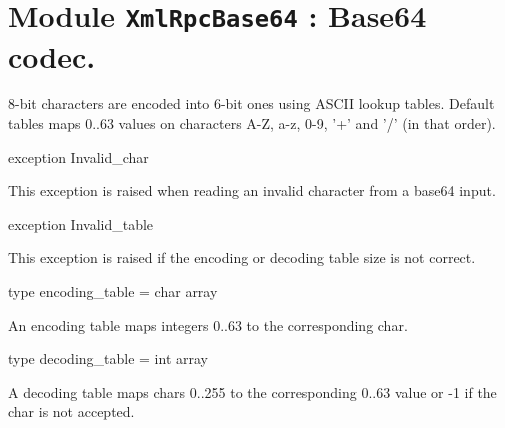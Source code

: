 \documentclass[11pt]{article}
\begin{document}
\section{Module {\tt{XmlRpcBase64}} : Base64 codec.}
\label{module:XmlRpcBase64}



	8-bit characters are encoded into 6-bit ones using ASCII lookup tables.
	Default tables maps 0..63 values on characters A-Z, a-z, 0-9, '+' and '/'
	(in that order).



\ocamldocvspace{0.5cm}



\label{exception:XmlRpcBase64.Invalid-underscorechar}\begin{ocamldoccode}
exception Invalid_char
\end{ocamldoccode}
\begin{ocamldocdescription}
This exception is raised when reading an invalid character
	from a base64 input.


\end{ocamldocdescription}




\label{exception:XmlRpcBase64.Invalid-underscoretable}\begin{ocamldoccode}
exception Invalid_table
\end{ocamldoccode}
\begin{ocamldocdescription}
This exception is raised if the encoding or decoding table
	size is not correct.


\end{ocamldocdescription}




\label{type:XmlRpcBase64.encoding-underscoretable}\begin{ocamldoccode}
type encoding_table = char array 
\end{ocamldoccode}
\begin{ocamldocdescription}
An encoding table maps integers 0..63 to the corresponding char.


\end{ocamldocdescription}




\label{type:XmlRpcBase64.decoding-underscoretable}\begin{ocamldoccode}
type decoding_table = int array 
\end{ocamldoccode}
\begin{ocamldocdescription}
A decoding table maps chars 0..255 to the corresponding 0..63 value
 or -1 if the char is not accepted.


\end{ocamldocdescription}
\end{document}
